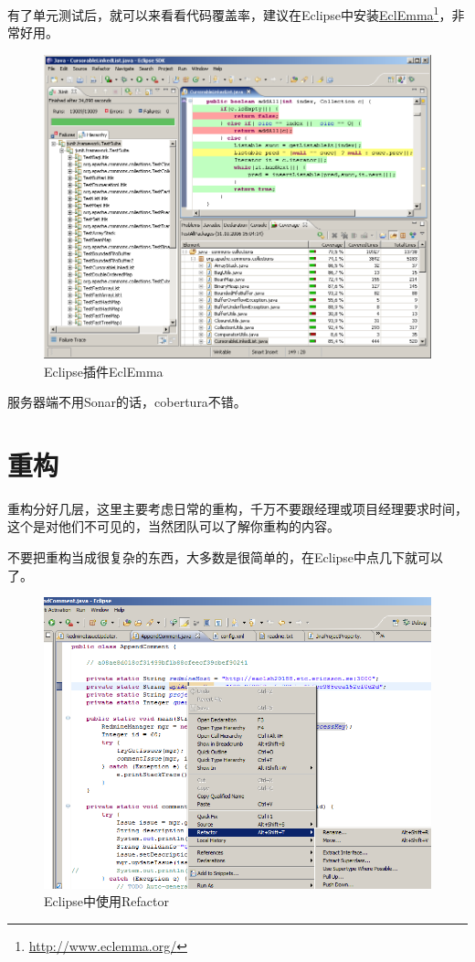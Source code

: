有了单元测试后，就可以来看看代码覆盖率，建议在Eclipse中安装\href{http://www.eclemma.org/}{EclEmma}\footnote{\href{http://www.eclemma.org/}{http:/\slash www.eclemma.org\slash }}，非常好用。

\begin{figure}[htbp]
\centering
\includegraphics[keepaspectratio,width=\textwidth,height=0.75\textheight]{img/18333fig0402-tn.png}
\caption{Eclipse插件EclEmma}
\end{figure}

服务器端不用Sonar的话，cobertura不错。

\section{重构}
\label{重构}

重构分好几层，这里主要考虑日常的重构，千万不要跟经理或项目经理要求时间，这个是对他们不可见的，当然团队可以了解你重构的内容。

不要把重构当成很复杂的东西，大多数是很简单的，在Eclipse中点几下就可以了。

\begin{figure}[htbp]
\centering
\includegraphics[keepaspectratio,width=\textwidth,height=0.75\textheight]{img/18333fig0403-tn.png}
\caption{Eclipse中使用Refactor}
\end{figure}

